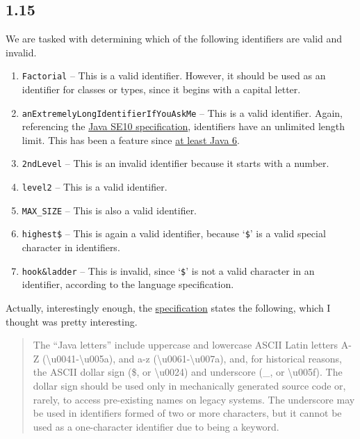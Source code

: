 \documentclass[leqno, 11pt]{article}
\begin{document}
\subsection*{1.15}
We are tasked with determining which of the following identifiers are valid and invalid.
\begin{enumerate}
  \item \texttt{Factorial} -- This is a valid identifier. However, it should be used as an identifier for classes or types, since it begins with a capital letter.
  \item \texttt{anExtremelyLongIdentifierIfYouAskMe} -- This is a valid identifier. Again, referencing the \href{https://docs.oracle.com/javase/specs/jls/se10/html/jls-3.html#jls-3.8}{Java SE10 specification}, identifiers have an unlimited length limit. This has been a feature since \href{https://docs.oracle.com/javase/specs/jls/se6/html/lexical.html#3.8}{at least Java 6}.
  \item \texttt{2ndLevel} -- This is an invalid identifier because it starts with a number.
  \item \texttt{level2} -- This is a valid identifier.
  \item \texttt{MAX\_SIZE} -- This is also a valid identifier.
  \item \texttt{highest\$} -- This is again a valid identifier, because `\texttt{\$}' is a valid special character in identifiers.
  \item \texttt{hook\&ladder} -- This is invalid, since `\texttt{\$}' is not a valid character in an identifier, according to the language specification.
\end{enumerate}
Actually, interestingly enough, the \href{https://docs.oracle.com/javase/specs/jls/se10/html/jls-3.html#jls-3.8}{specification} states the following, which I thought was pretty interesting.
\begin{quote}
  The ``Java letters'' include uppercase and lowercase ASCII Latin letters A-Z (\textbackslash u0041-\textbackslash u005a), and a-z (\textbackslash u0061-\textbackslash u007a), and, for historical reasons, the ASCII dollar sign (\$, or \textbackslash u0024) and underscore (\_, or \textbackslash u005f). The dollar sign should be used only in mechanically generated source code or, rarely, to access pre-existing names on legacy systems. The underscore may be used in identifiers formed of two or more characters, but it cannot be used as a one-character identifier due to being a keyword.
\end{quote}
\end{document}
